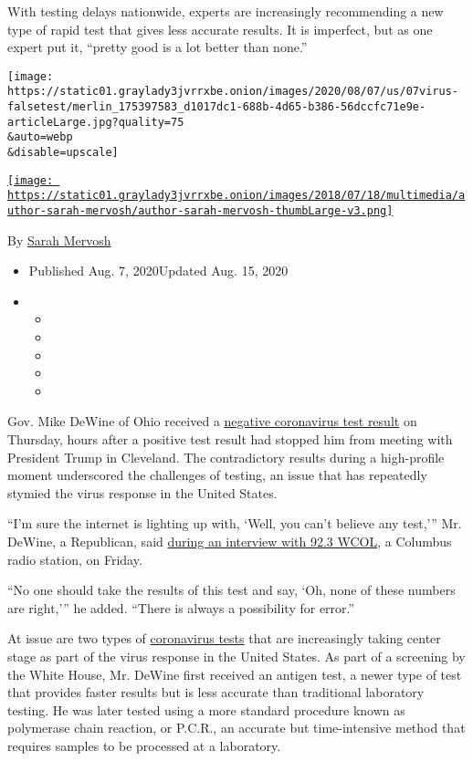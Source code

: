 With testing delays nationwide, experts are increasingly recommending a
new type of rapid test that gives less accurate results. It is
imperfect, but as one expert put it, ``pretty good is a lot better than
none.''

\texttt{[image: https://static01.graylady3jvrrxbe.onion/images/2020/08/07/us/07virus-falsetest/merlin\_175397583\_d1017dc1-688b-4d65-b386-56dccfc71e9e-articleLarge.jpg?quality=75\\\&auto=webp\\\&disable=upscale]}

\href{https://www.nytimes3xbfgragh.onion/by/sarah-mervosh}{\texttt{[image: https://static01.graylady3jvrrxbe.onion/images/2018/07/18/multimedia/author-sarah-mervosh/author-sarah-mervosh-thumbLarge-v3.png]}}

By \href{https://www.nytimes3xbfgragh.onion/by/sarah-mervosh}{Sarah
Mervosh}

\begin{itemize}
\item
  Published Aug. 7, 2020Updated Aug. 15, 2020
\item
  \begin{itemize}
  \item
  \item
  \item
  \item
  \item
  \end{itemize}
\end{itemize}

Gov. Mike DeWine of Ohio received a
\href{https://www.nytimes3xbfgragh.onion/2020/08/06/us/mike-dewine-coronavirus.html}{negative
coronavirus test result} on Thursday, hours after a positive test result
had stopped him from meeting with President Trump in Cleveland. The
contradictory results during a high-profile moment underscored the
challenges of testing, an issue that has repeatedly stymied the virus
response in the United States.

``I'm sure the internet is lighting up with, `Well, you can't believe
any test,''' Mr. DeWine, a Republican, said
\href{https://www.iheart.com/podcast/433-woody-the-wake-up-call-28200119/episode/governor-mike-dewine-talks-about-his-69800541/?autoplay=true}{during
an interview with 92.3 WCOL}, a Columbus radio station, on Friday.

``No one should take the results of this test and say, `Oh, none of
these numbers are right,''' he added. ``There is always a possibility
for error.''

At issue are two types of
\href{https://www.nytimes3xbfgragh.onion/2020/08/15/us/coronavirus-testing-decrease.html}{coronavirus
tests} that are increasingly taking center stage as part of the virus
response in the United States. As part of a screening by the White
House, Mr. DeWine first received an antigen test, a newer type of test
that provides faster results but is less accurate than traditional
laboratory testing. He was later tested using a more standard procedure
known as polymerase chain reaction, or P.C.R., an accurate but
time-intensive method that requires samples to be processed at a
laboratory.

